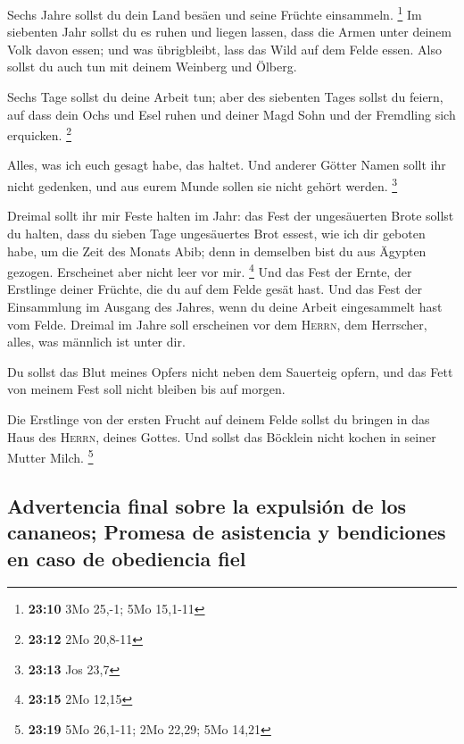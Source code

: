  Sechs Jahre sollst du dein Land besäen und seine Früchte
einsammeln. \footnote{\textbf{23:10} 3Mo 25,-1; 5Mo 15,1-11}
 Im siebenten Jahr sollst du es ruhen und liegen lassen,
dass die Armen unter deinem Volk davon essen; und was übrigbleibt, lass
das Wild auf dem Felde essen. Also sollst du auch tun mit deinem
Weinberg und Ölberg.

 Sechs Tage sollst du deine Arbeit tun; aber des
siebenten Tages sollst du feiern, auf dass dein Ochs und Esel ruhen und
deiner Magd Sohn und der Fremdling sich erquicken. \footnote{\textbf{23:12}
  2Mo 20,8-11}

 Alles, was ich euch gesagt habe, das haltet. Und anderer
Götter Namen sollt ihr nicht gedenken, und aus eurem Munde sollen sie
nicht gehört werden. \footnote{\textbf{23:13} Jos 23,7}

 Dreimal sollt ihr mir Feste halten im Jahr:
 das Fest der ungesäuerten Brote sollst du halten, dass
du sieben Tage ungesäuertes Brot essest, wie ich dir geboten habe, um
die Zeit des Monats Abib; denn in demselben bist du aus Ägypten gezogen.
Erscheinet aber nicht leer vor mir. \footnote{\textbf{23:15} 2Mo 12,15}
 Und das Fest der Ernte, der Erstlinge deiner Früchte,
die du auf dem Felde gesät hast. Und das Fest der Einsammlung im Ausgang
des Jahres, wenn du deine Arbeit eingesammelt hast vom Felde.
 Dreimal im Jahre soll erscheinen vor dem \textsc{Herrn},
dem Herrscher, alles, was männlich ist unter dir.

 Du sollst das Blut meines Opfers nicht neben dem
Sauerteig opfern, und das Fett von meinem Fest soll nicht bleiben bis
auf morgen.

 Die Erstlinge von der ersten Frucht auf deinem Felde
sollst du bringen in das Haus des \textsc{Herrn}, deines Gottes. Und
sollst das Böcklein nicht kochen in seiner Mutter Milch. \footnote{\textbf{23:19}
  5Mo 26,1-11; 2Mo 22,29; 5Mo 14,21}

\hypertarget{advertencia-final-sobre-la-expulsiuxf3n-de-los-cananeos-promesa-de-asistencia-y-bendiciones-en-caso-de-obediencia-fiel}{%
\subsection{Advertencia final sobre la expulsión de los cananeos;
Promesa de asistencia y bendiciones en caso de obediencia
fiel}\label{advertencia-final-sobre-la-expulsiuxf3n-de-los-cananeos-promesa-de-asistencia-y-bendiciones-en-caso-de-obediencia-fiel}}

